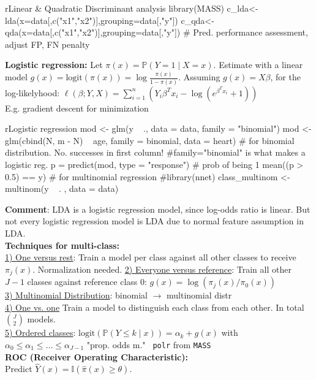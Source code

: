 \begin{codebox}{r}{Linear \& Quadratic Discriminant analysis}
library(MASS)
c_lda<-lda(x=data[,c("x1","x2")],grouping=data[,"y"])
c_qda<-qda(x=data[,c("x1","x2")],grouping=data[,"y"])
# Pred. performance assessment, adjust FP, FN penalty
\end{codebox}
\textbf{Logistic regression:} Let $\pi(x) = \mathbb{P}(Y=1\mid X = x)$. Estimate with a linear model $g(x) = \text{logit}(\pi(x)) = \log\frac{\pi(x)}{1-\pi(x)}$. Assuming $g(x) = X\beta$, for the log-likelyhood:
$\ell(\beta;Y,X)=\sum_{i=1}^n\left(Y_i \beta^Tx_i - \log\left(e^{\beta^Tx_i} +1\right)\right)$\\
E.g. gradient descent for minimization\\
\begin{codebox}{r}{Logistic regression}
mod <- glm(y ~ ., data = data, family = "binomial")
mod <- glm(cbind(N, m - N) ~ age, family = binomial, data = heart) # for binomial distribution. No. successes in first column!
#family="binomial" is what makes a logistic reg.
p = predict(mod, type = "response") # prob of being 1
mean((p > 0.5) == y)
# for multinomial regression #library(nnet)
class_multinom <- multinom(y ~ . , data = data)
\end{codebox}
\textbf{Comment}: LDA is a logistic regression model, since log-odds ratio is linear. But not every logistic regression model is LDA due to normal feature assumption in LDA.\\
\textbf{Techniques for multi-class:}\\
\underline{1) One versus rest}: Train a model per class against all other classes to receive $\pi_j(x)$. Normalization needed. 
\underline{2) Everyone versus reference}: Train all other $J-1$ classes against reference class $0$: $g(x) = \log(\pi_j(x)/\pi_0(x))$\\
\underline{3) Multinomial Distribution}: binomial $\rightarrow$ multinomial distr\\
\underline{4) One vs. one}
Train a model to distinguish each class from each other. In total $\binom{J}{2}$ models.\\
\underline{5) Ordered classes}: $\text{logit}(\mathbb{P}(Y\leq k \mid x))=\alpha_k +g(x)$ with $\alpha_0\leq\alpha_1\leq\dots\leq \alpha_{J-1}$ "prop. odds m." \texttt{ polr} from \texttt{MASS}\\
\textbf{ROC (Receiver Operating Characteristic):}\\
Predict $\hat Y(x) = \mathbb{I}(\hat{\pi}(x)\geq \theta)$. \\

